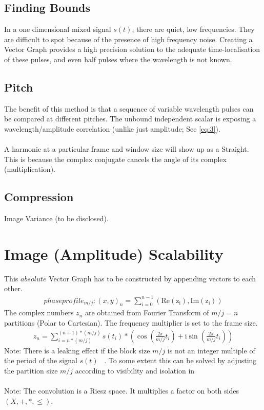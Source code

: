 \documentclass{report}
\begin{document}
\subsection{Finding Bounds}
In a one dimensional mixed signal $s(t)$, there are quiet, low frequencies. They are difficult to spot because of the presence of high frequency noise. Creating a Vector Graph provides a high precision solution to the adequate time-localisation of these pulses, and even half pulses where the wavelength is not known.
\subsection{Pitch}
The benefit of this method is that a sequence of variable wavelength pulses can be compared at different pitches. The unbound independent scalar is exposing a wavelength/amplitude correlation (unlike just amplitude; See \eqref{eq:3}).\\\\
A harmonic at a particular frame and window size will show up as a Straight. This is because the complex conjugate cancels the angle of its complex (multiplication).
\subsection{Compression}
Image Variance (to be disclosed).
\section{Image (Amplitude) Scalability}
This $absolute$ Vector Graph has to be constructed by appending vectors to each other.
\begin{align}
phaseprofile_{m/j}: (x,y)_{n}=\sum \limits _{i=0}^{n-1}(\mathrm{Re(z_{i})},\mathrm{Im(z_{i})})
\end{align}
The complex numbers $z_{n}$ are obtained from Fourier Transform of $m/j=n$ partitions (Polar to Cartesian). The frequency multiplier is set to the frame size.
\begin{align}
z_{n}= \sum \limits _{i=n*(m/j)}^{(n+1)*(m/j)} s(t_{i})*(\cos(\frac{2\pi}{m/j}t_{i})+\mathrm{i}\sin(\frac{2\pi}{m/j}t_{i}))\label{eq:3}
\end{align}
Note: There is a leaking effect if the block size $m/j$ is not an integer multiple of the period of the signal $s(t)$ ~\cite[Fensterfunktion]{Fensterfunktion}. To some extent this can be solved by adjusting the partition size $m/j$ according to visibility and isolation in ~\cite[Stopeight\_Comparator.tex]{Comparator}\\\\
Note: The convolution is a Riesz space. It multiplies a factor on both sides $(X,+,*,\leq)$.
\end{document}
